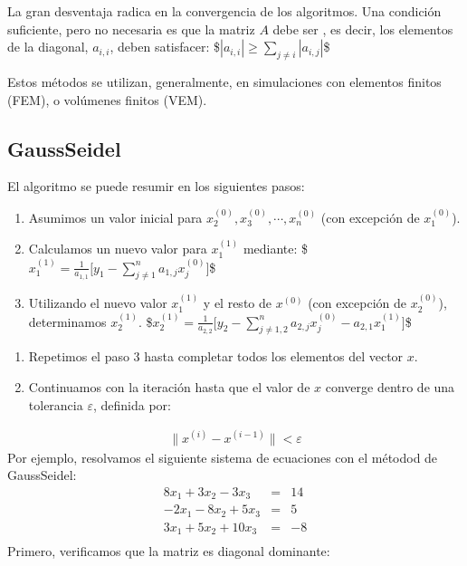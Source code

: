 \documentclass[letterpaper,10pt,english]{jupyterBook}
\begin{document}
\sphinxAtStartPar
La gran desventaja radica en la convergencia de los algoritmos. Una condición suficiente, pero no necesaria es que la matriz \(A\) debe ser , es decir, los elementos de la diagonal, \(a_{i,i}\), deben satisfacer:
\$\(|a_{i,i}| \geq \sum_{j\neq i} |a_{i,j}|\)\$

\sphinxAtStartPar
Estos métodos se utilizan, generalmente, en simulaciones con elementos finitos (FEM), o volúmenes finitos (VEM).


\subsection{Gauss\sphinxhyphen{}Seidel}
\label{\detokenize{1.2-Algebra_lineal/1.2-Algebra_lineal:gauss-seidel}}
\sphinxAtStartPar
El algoritmo se puede resumir en los siguientes pasos:
\begin{enumerate}
%
\item {} 
\sphinxAtStartPar
Asumimos un valor inicial para \(x_2^{(0)}, x_3^{(0)}, \cdots, x_n^{(0)}\) (con excepción de \(x_1^{(0)}\)).

\item {} 
\sphinxAtStartPar
Calculamos un nuevo valor para \(x_1^{(1)}\) mediante:
\$\(
x_1^{(1)} = \frac{1}{a_{1,1}}\Big[y_1 - \sum_{j \ne 1}^{n}{a_{1,j}x_j^{(0)}} \Big]
\)\$

\item {} 
\sphinxAtStartPar
Utilizando el nuevo valor \(x_1^{(1)}\) y el resto de \(x^{(0)}\) (con excepción de \(x_2^{(0)}\)), determinamos \(x_2^{(1)}\).
\$\(
x_2^{(1)} = \frac{1}{a_{2,2}}\Big[y_2 - \sum_{j \ne 1,2}^{n}{a_{2,j}x_j^{(0)}}  - {a_{2,1}x_1^{(1)}}\Big]
\)\$

\end{enumerate}
\begin{enumerate}
%
\item {} 
\sphinxAtStartPar
Repetimos el paso 3 hasta completar todos los elementos del vector \(x\).

\item {} 
\sphinxAtStartPar
Continuamos con la iteración hasta que el valor de \(x\) converge dentro de una tolerancia \(\varepsilon\), definida por:

\end{enumerate}
\begin{equation*}
\begin{split}\| x^{(i)} - x^{(i-1)}\| \lt \varepsilon\end{split}
\end{equation*}
\sphinxAtStartPar
Por ejemplo, resolvamos el siguiente sistema de ecuaciones con el métodod de Gauss\sphinxhyphen{}Seidel:
\begin{eqnarray*}
8x_1 + 3x_2 - 3x_3 &=& 14 \\
-2x_1 - 8x_2 + 5x_3 &=& 5 \\
3x_1 + 5x_2 + 10x_3 & =& -8 \\
\end{eqnarray*}
\sphinxAtStartPar
Primero, verificamos que la matriz es diagonal dominante:
\end{document}
